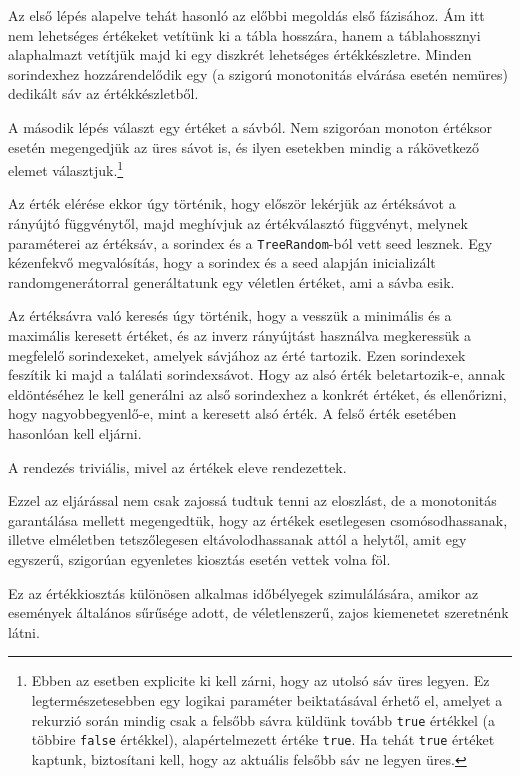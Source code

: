 \documentclass[
    parspace,
    noindent,
    nohyp,
]{elteiktdk}[2023/04/10]
\begin{document}
Az első lépés alapelve tehát hasonló az előbbi megoldás első fázisához.
Ám itt nem lehetséges értékeket vetítünk ki a tábla hosszára,
hanem a táblahossznyi alaphalmazt vetítjük majd ki egy diszkrét lehetséges értékkészletre.
Minden sorindexhez hozzárendelődik egy (a szigorú monotonitás elvárása esetén nemüres)
dedikált sáv az értékkészletből.

A második lépés választ egy értéket a sávból.
Nem szigoróan monoton értéksor esetén megengedjük az üres sávot is,
és ilyen esetekben mindig a rákövetkező elemet választjuk.\footnote{
  Ebben az esetben explicite ki kell zárni, hogy az utolsó sáv üres legyen.
  Ez legtermészetesebben egy logikai paraméter beiktatásával érhető el,
  amelyet a rekurzió során mindig csak a felsőbb sávra küldünk tovább \texttt{true} értékkel
  (a többire \texttt{false} értékkel),
  alapértelmezett értéke \texttt{true}.
  Ha tehát \texttt{true} értéket kaptunk, biztosítani kell, hogy az aktuális felsőbb sáv ne legyen üres.
}

Az érték elérése ekkor úgy történik, hogy először lekérjük az értéksávot a rányújtó függvénytől,
majd meghívjuk az értékválasztó függvényt,
melynek paraméterei az értéksáv, a sorindex és a \texttt{TreeRandom}-ból vett seed lesznek.
Egy kézenfekvő megvalósítás,
hogy a sorindex és a seed alapján inicializált randomgenerátorral
generáltatunk egy véletlen értéket, ami a sávba esik.

Az értéksávra való keresés úgy történik, hogy a vesszük a minimális és a maximális keresett értéket,
és az inverz rányújtást használva megkeressük a megfelelő sorindexeket, amelyek sávjához az érté tartozik.
Ezen sorindexek feszítik ki majd a találati sorindexsávot.
Hogy az alsó érték beletartozik-e, annak eldöntéséhez le kell generálni
az alső sorindexhez a konkrét értéket, és ellenőrizni, hogy nagyobbegyenlő-e,
mint a keresett alsó érték.
A felső érték esetében hasonlóan kell eljárni.

A rendezés triviális, mivel az értékek eleve rendezettek.

Ezzel az eljárással nem csak zajossá tudtuk tenni az eloszlást,
de a monotonitás garantálása mellett megengedtük,
hogy az értékek esetlegesen csomósodhassanak,
illetve elméletben tetszőlegesen eltávolodhassanak attól a helytől,
amit egy egyszerű, szigorúan egyenletes kiosztás esetén vettek volna föl.

Ez az értékkiosztás különösen alkalmas időbélyegek szimulálására,
amikor az események általános sűrűsége adott,
de véletlenszerű, zajos kiemenetet szeretnénk látni.
\end{document}

